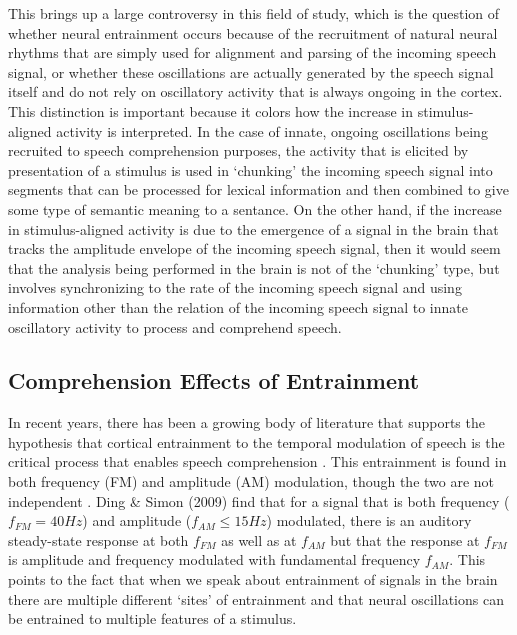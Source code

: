 \documentclass[titlepage]{article}
\begin{document}
    This brings up a large controversy in this field of study, which is the question of whether
    neural entrainment occurs because of the recruitment of natural neural rhythms that are simply
    used for alignment and parsing of the incoming speech signal, or whether these oscillations are
    actually generated by the speech signal itself and do not rely on oscillatory activity that is
    always ongoing in the cortex. This distinction is important because it colors how the increase
    in stimulus-aligned activity is interpreted. In the case of innate, ongoing oscillations being
    recruited to speech comprehension purposes, the activity that is elicited by presentation of a
    stimulus is used in `chunking' the incoming speech signal into segments that can be processed
    for lexical information and then combined to give some type of semantic meaning to a sentance.
    On the other hand, if the increase in stimulus-aligned activity is due to the emergence of a
    signal in the brain that tracks the amplitude envelope of the incoming speech signal, then
    it would seem that the analysis being performed in the brain is not of the `chunking' type,
    but involves synchronizing to the rate of the incoming speech signal and using information
    other than the relation of the incoming speech signal to innate oscillatory activity to
    process and comprehend speech.

  \subsection{Comprehension Effects of Entrainment}

    In recent years, there has been a growing body of literature that supports the hypothesis
    that cortical entrainment to the temporal modulation of speech is the critical process
    that enables speech comprehension \cite{Meyer2018,Morillon2015,ZionGolumbic2013,Doelling2014}.
    This entrainment is found in both frequency (FM) and amplitude (AM) modulation, though the
    two are not independent \cite{Ding2009}. Ding \& Simon (2009) \cite{Ding2009} find that for a signal that
    is both frequency ($f_{FM}=40Hz$) and amplitude ($f_{AM}\leq 15Hz$) modulated, there is an auditory
    steady-state response at both $f_{FM}$ as well as at $f_{AM}$ but that the response at $f_{FM}$ is
    amplitude and frequency modulated with fundamental frequency $f_{AM}$. This points to the fact that
    when we speak about entrainment of signals in the brain there are multiple different `sites' of entrainment
    and that neural oscillations can be entrained to multiple features of a stimulus.
\end{document}
